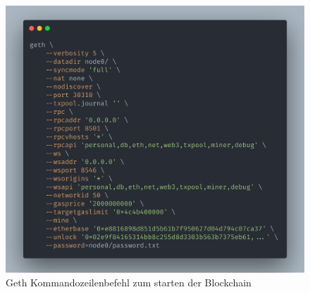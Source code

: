 \begin{figure}[hbt!]
	\centering
	\includegraphics[width=.9\columnwidth]{./Abbildungen/Kapitel_03/geth.png}
	\caption[Geth]{Geth Kommandozeilenbefehl zum starten der Blockchain}
	\label{img:geth}
\end{figure}



